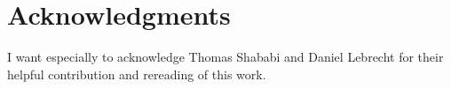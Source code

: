 \chapter*{Acknowledgments}

I want especially to acknowledge Thomas Shababi and Daniel Lebrecht for their
helpful contribution and rereading of this work.
